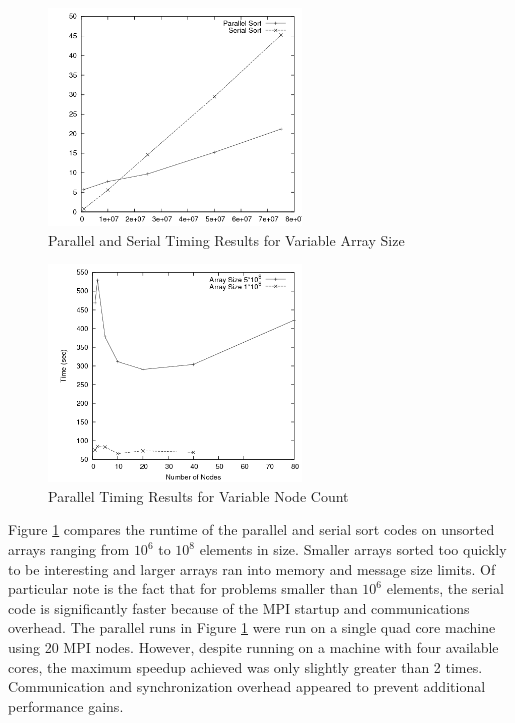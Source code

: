 \documentclass{article}
\begin{document}
\begin{figure}
\centering
\includegraphics[width=0.6\textwidth]{img/comparison1.png}
\caption{Parallel and Serial Timing Results for Variable Array Size}
\label{chart1}
\end{figure}

\begin{figure}
\centering
\includegraphics[width=0.6\textwidth]{img/comparison2.png}
\caption{Parallel Timing Results for Variable Node Count}
\label{chart2}
\end{figure}

Figure \ref{chart1} compares the runtime of the parallel and serial sort codes on unsorted arrays ranging from \(10^6\) to \(10^8\) elements in size. Smaller arrays sorted too quickly to be interesting and larger arrays ran into memory and message size limits. Of particular note is the fact that for problems smaller than \(10^6\) elements, the serial code is significantly faster because of the MPI startup and communications overhead. The parallel runs in Figure \ref{chart1} were run on a single quad core machine using 20 MPI nodes. However, despite running on a machine with four available cores, the maximum speedup achieved was only slightly greater than 2 times. Communication and synchronization overhead appeared to prevent additional performance gains.
\end{document}
